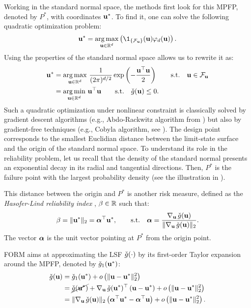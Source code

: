 Working in the standard normal space, the methods first look for this MPFP, denoted by $P^*$, with coordinates ${\bf u}^*$. 
To find it, one can solve the following quadratic optimization problem: 
\begin{equation}
    \bu^* = \argmax_{\bu \in \R^d} \left(\1_{\{\iF_\bu\}}(\bu) \varphi_d(\bu)\right).
\end{equation}
Using the properties of the standard normal space allows us to rewrite it as: 
\begin{align}
    {\bf u}^* &= \operatorname*{arg\,max}_{{\bf u} \in \mathbb{R}^d} \, \frac{1}{(2\pi)^{d/2}} \exp\left(-\frac{{\bf u}^\top {\bf u} }{2} \right) \qquad \mathrm{s.t.} \quad {\bf u} \in \mathcal{F}_{{\bf u}}\\
          &= \operatorname*{arg\,min}_{{\bf u} \in \mathbb{R}^d} \, {\bf u}^\top {\bf u} \qquad \mathrm{s.t.} \quad \check{g}({\bf u}) \leq 0.
\end{align}
Such a quadratic optimization under nonlinear constraint is classically solved by gradient descent algorithms (e.g., Abdo-Rackwitz algorithm from \citealp{abdo_rack_1991}) but also by gradient-free techniques (e.g., Cobyla algorithm, see \citealp{powell_1994}). 
The design point corresponds to the smallest Euclidian distance between the limit-state surface and the origin of the standard normal space. 
To understand its role in the reliability problem, let us recall that the density of the standard normal presents an exponential decay in its radial and tangential directions. 
Then, $P^*$ is the failure point with the largest probability density (see the illustration in ). 

This distance between the origin and $P^*$ is another risk measure, defined as the \textit{Hasofer-Lind reliability index} \citep{lemaire_2009}, $\beta \in \mathbb{R}$ such that:
\begin{equation}
    \beta = \Vert {\bf u}^* \Vert_2 = {\boldsymbol{\alpha}} ^\top {\bf u}^*, \qquad \mathrm{s.t.} \quad
        {\boldsymbol{\alpha}} = \frac{\nabla_{{\bf u}} \,  \check{g}({\bf u})}{\Vert \nabla_{{\bf u}} \,  \check{g}({\bf u}) \Vert_2}.      
\end{equation}
The vector ${\boldsymbol{\alpha}}$ is the unit vector pointing at $P^*$ from the origin point. 

FORM aims at approximating the LSF $\check{g}(\cdot)$ by its first-order Taylor expansion around the MPFP, denoted by $\check{g}_1({\bf u}^*)$: 
\begin{equation}
    \begin{split}
        \check{g}({\bf u}) &= \check{g}_1({\bf u}^*) + o\left(\Vert {\bf u} - {\bf u}^* \Vert_2^2\right)\\
                 &= \cancel{\check{g}({\bf u}^*)} + \nabla_{{\bf u}} \,  \check{g}({\bf u}^*)^\top \left({\bf u} -{\bf u}^* \right) + o\left(\Vert {\bf u} - {\bf u}^* \Vert_2^2\right)\\
                 &= \Vert \nabla_{{\bf u}} \, \check{g}({\bf u}) \Vert_2 \left({\boldsymbol{\alpha}}^\top {\bf u}^* - {\boldsymbol{\alpha}}^\top {\bf u} \right) + o\left(\Vert {\bf u} - {\bf u}^* \Vert_2^2\right).
    \end{split}    
\end{equation}
 
